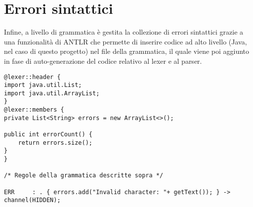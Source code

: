 \documentclass[../report.tex]{subfiles}
\begin{document}
\section{Errori sintattici}\label{s:errori-sintattici}
Infine, a livello di grammatica è gestita la collezione di errori sintattici grazie a una funzionalità di ANTLR che permette di inserire codice ad alto livello (Java, nel caso di questo progetto) nel file della grammatica, il quale viene poi aggiunto in fase di auto-generazione del codice relativo al lexer e al parser.
\begin{lstlisting}[style=antlr]
@lexer::header {
import java.util.List;
import java.util.ArrayList;
}
@lexer::members {
private List<String> errors = new ArrayList<>();

public int errorCount() {
    return errors.size();
}
}

/* Regole della grammatica descritte sopra */

ERR     : . { errors.add("Invalid character: "+ getText()); } -> channel(HIDDEN);
\end{lstlisting}
\end{document}
